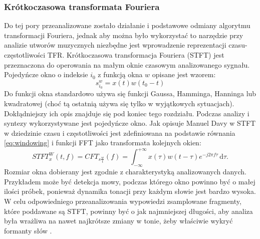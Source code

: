 \documentclass[12pt,a4paper,twoside]{mwart}
\begin{document}
\subsubsection{Krótkoczasowa transformata Fouriera}\label{sec:STFT}
Do tej pory przeanalizowane zostało działanie i podstawowe odmiany algorytmu transformacji Fouriera, jednak aby można było wykorzystać to narzędzie przy analizie utworów muzycznych niezbędne jest wprowadzenie reprezentacji czasu-częstotliwości TFR. Krótkoczasowa transformacja Fouriera (STFT) jest przeznaczona do operowania na małym oknie czasowym analizowanego sygnału. Pojedyńcze okno o indeksie $i_0$ z funkcją okna $w$ opisane jest wzorem:
\begin{equation} \label{eq:windowing}
  s_{i_0}^w = x(t)w(t_0 - t)
\end{equation}
Do funkcji okna standardowo używa się funkcji Gaussa, Hamminga, Hanninga lub kwadratowej (choć tą ostatnią używa się tylko w wyjątkowych sytuacjach). Dokłądniejszy ich opis znajduje się pod koniec tego rozdziału. Podczas analizy i syntezy wykorzystywane jest pojedyńcze okno. Jak opisuje Manuel Davy w \cite[22-25]{Transcription:Anssi:SignalProcessingMethods} STFT w dziedzinie czasu i częstotliwości jest zdefiniowana na podstawie równania \ref{eq:windowing} i funkcji FFT jako transformata kolejnych okien:
\begin{equation} \label{eq:STFT1}
  STFT^{W}_{x}(t,f) = CFT_{s \frac{w}{t}}(f) = \int_{-\infty}^{+\infty} x(\tau)w(t - \tau)e^{-j2\pi f\tau}  \,\mathrm{d}\tau.
\end{equation}
Rozmiar okna dobierany jest zgodnie z charakterystyką analizowanych danych. Przykładem może być detekcja mowy, podczas którego okno powinno być o małej ilości próbek, ponieważ dynamika tonacji przy każdym słowie jest bardzo wysoka. W celu odpowiedniego przeanalizowania wypowiedzi zsamplowane fragmenty, które poddawane są STFT, powinny być o jak najmniejszej długości, aby analiza była wrażliwa na nawet najkrótsze zmiany w tonie, żeby właściwie wykryć formanty słów
\cite[804–805]{Transcription:Klapuri:MultipleFundamentalFrequencyEstimation}.
\end{document}
